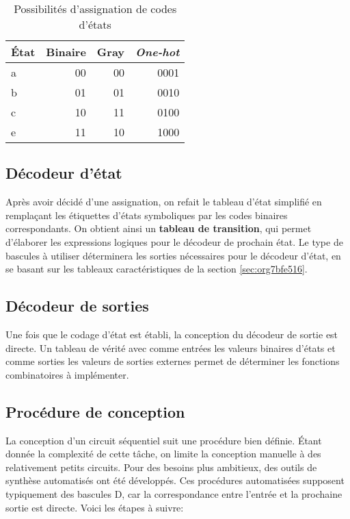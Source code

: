 \documentclass[11pt]{article}
\begin{document}
\begin{table}[htbp]
\caption{\label{tab:orgaab1a8c}Possibilités d'assignation de codes d'états}
\centering
\begin{tabular}{lrrr}
État & Binaire & Gray & \emph{One-hot}\\
\hline
a & 00 & 00 & 0001\\
b & 01 & 01 & 0010\\
c & 10 & 11 & 0100\\
e & 11 & 10 & 1000\\
\end{tabular}
\end{table}

\subsection{Décodeur d'état}
\label{sec:org698a6de}

Après avoir décidé d'une assignation, on refait le tableau d'état
simplifié en remplaçant les étiquettes d'états symboliques par les
codes binaires correspondants. On obtient ainsi un \textbf{tableau de
transition}, qui permet d'élaborer les expressions logiques pour le
décodeur de prochain état. Le type de bascules à utiliser déterminera
les sorties nécessaires pour le décodeur d'état, en se basant sur les
tableaux caractéristiques de la section \ref{sec:org7bfe516}.

\subsection{Décodeur de sorties}
\label{sec:orgb61661e}

Une fois que le codage d'état est établi, la conception du décodeur de
sortie est directe. Un tableau de vérité avec comme entrées les
valeurs binaires d'états et comme sorties les valeurs de sorties
externes permet de déterminer les fonctions combinatoires à
implémenter.

\subsection{Procédure de conception}
\label{sec:org3b9afb9}

La conception d'un circuit séquentiel suit une procédure bien
définie. Étant donnée la complexité de cette tâche, on limite la
conception manuelle à des relativement petits circuits. Pour des
besoins plus ambitieux, des outils de synthèse automatisés ont été
développés. Ces procédures automatisées supposent typiquement des
bascules D, car la correspondance entre l'entrée et la prochaine
sortie est directe. Voici les étapes à suivre:
\end{document}
